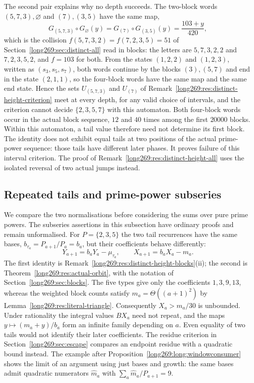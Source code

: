 \documentclass[11pt]{article}
\theoremstyle{remark}
\theoremstyle{plain}
\begin{document}
The second pair explains why no depth succeeds.  The two-block words
$(5,7,3),\varnothing$ and $(7),(3,5)$ have the same map,
\[
 G_{(5,7,3)}\circ G_\varnothing(y)=G_{(7)}\circ G_{(3,5)}(y)=\frac{103+y}{420},
\]
which is the collision $f(5,7,3,2)=f(7,2,3,5)=51$ of
Section~\ref{long269:sec:distinct-all} read in blocks: the letters are
$5,7,3,2,2$ and $7,2,3,5,2$, and $f=103$ for both.  From the states
$(1,2,2)$ and $(1,2,3)$, written as $(s_3,s_5,s_7)$, both words continue by
the blocks $(3),(5,7)$ and end in the state $(2,1,1)$, so the four-block
words have the same map and the same end state.  Hence the sets $U_{(5,7,3)}$
and $U_{(7)}$ of Remark~\ref{long269:res:distinct-height-criterion} meet at
every depth, for any valid choice of intervals, and the criterion cannot
decide $\{2,3,5,7\}$ with this automaton.  Both four-block words occur in
the actual block sequence, $12$ and $40$ times among the first $20000$
blocks.  Within this automaton, a tail value therefore need not determine its first block. The identity does not exhibit equal tails at two positions of the actual prime-power sequence: those tails have different later phases. It proves failure of this interval criterion. The proof of Remark~\ref{long269:res:distinct-height-all} uses the isolated reversal of two actual jumps instead.

\subsection{Repeated tails and prime-power subseries}
\label{long269:sec:distinct-stop}

We compare the two normalisations before considering the sums over pure
prime powers. The subseries assertions in this subsection have ordinary
proofs and remain unformalised. For $P=\{2,3,5\}$ the two tail recurrences
have the same bases,
$b_{\tau_a}=P_{a+1}/P_a=b_a$, but their coefficients behave differently:
\[
 Y_{a+1}=b_aY_a-\mu_{\tau_a},\qquad
 X_{a+1}=b_aX_a-m_a.
\]
The first identity is Remark~\ref{long269:res:distinct-height-blocks}(ii);
the second is Theorem~\ref{long269:res:actual-orbit}, with the notation of
Section~\ref{long269:sec:blocks}. The five types give only the coefficients $1,3,9,13$, whereas the
weighted block counts satisfy
$m_a=\Theta((a+1)^2)$ by Lemma~\ref{long269:res:literal-triangle}.
Consequently $X_a>m_a/30$ is unbounded. Under rationality the integral
values $BX_a$ need not repeat, and the maps $y\mapsto(m_a+y)/b_a$ form
an infinite family depending on $a$. Even equality of two tails would
not identify their later coefficients. The residue criterion in
Section~\ref{long269:sec:escape} compares an endpoint residue with a
quadratic bound instead. The example after
Proposition~\ref{long269:long:windowconsumer} shows the limit of an argument
using just bases and growth: the same bases admit quadratic numerators
$\widehat m_a$ with $\sum_a\widehat m_a/P_{a+1}=9$.
\end{document}
